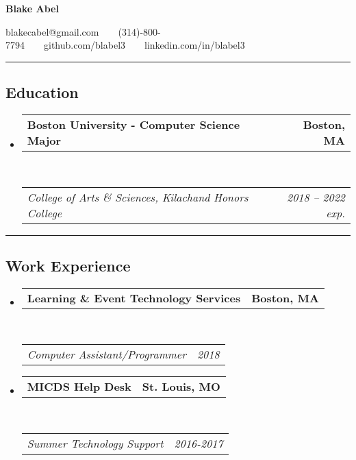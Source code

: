 \documentclass[11pt,letterpaper]{article}
\makeatletter
\newcommand{\headerrow}[2]
{\begin{tabular*}{\linewidth}{l@{\extracolsep{\fill}}r}
	#1 &
	#2 \\
\end{tabular*}}
\makeatother
\begin{document}
\begin{center}
{\LARGE \textbf{Blake Abel}}

blakecabel@gmail.com\ \ \textbullet \ \ (314)-800-7794\ \ \textbullet \ \ github.com/blabel3\ \ \textbullet \ \ linkedin.com/in/blabel3

\end{center}

\hrule
\vspace{-0.4em}
\subsection*{Education}

\begin{itemize}
	\parskip=0.1em

	\item 
	\headerrow
		{\textbf{Boston University - Computer Science Major}}
		{\textbf{Boston, MA}}
	\\
	\headerrow
		{\emph{College of Arts \& Sciences, Kilachand Honors College}}
		{\emph{2018 -- 2022 exp.}}
	

\end{itemize}

\hrule
\vspace{-0.4em}
\subsection*{Work Experience}

\begin{itemize}
	\parskip=0.1em

	\item
	\headerrow
		{\textbf{Learning \& Event Technology Services}}
		{\textbf{Boston, MA}}
	\\
	\headerrow
		{\emph{Computer Assistant/Programmer}}
		{\emph{2018}}

	\item
	\headerrow
		{\textbf{MICDS Help Desk}}
		{\textbf{St. Louis, MO}}
	\\
	\headerrow
		{\emph{Summer Technology Support}}
		{\emph{2016-2017}}

\end{itemize}
\end{document}
